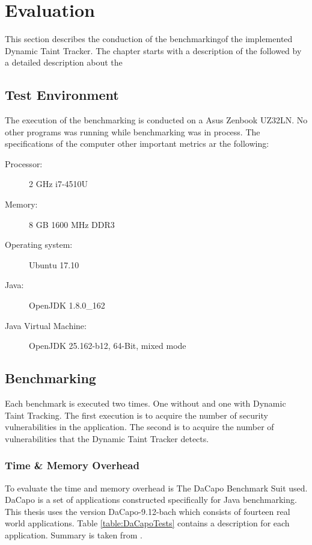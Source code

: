 \chapter{Evaluation}
This section describes the conduction of the benchmarkingof the implemented Dynamic Taint Tracker. The chapter starts with a description of the \textit{} followed by a detailed description about the \textit{}

\section{Test Environment}
\label{TestEnvironment}
The execution of the benchmarking is conducted on a Asus Zenbook UZ32LN. No other programs was running while benchmarking was in process. The specifications of the computer other important metrics ar the following:

\begin{description}
	\item [Processor:] 2 GHz i7-4510U
	\item [Memory:] 8 GB 1600 MHz DDR3
	\item [Operating system:] Ubuntu 17.10
	\item [Java:] OpenJDK 1.8.0\_162
	\item [Java Virtual Machine:] OpenJDK 25.162-b12, 64-Bit, mixed mode
\end{description}



\section{Benchmarking}
\label{Benchmarking}
Each benchmark is executed two times. One without and one with Dynamic Taint Tracking. The first execution is to acquire the number of security vulnerabilities in the application. The second is to acquire the number of vulnerabilities that the Dynamic Taint Tracker detects.



\subsection{Time \& Memory Overhead}
To evaluate the time and memory overhead is The DaCapo Benchmark Suit \parencite{dacapo} used. DaCapo is a set of applications constructed specifically for Java benchmarking. This thesis uses the version DaCapo-9.12-bach which consists of fourteen real world applications. Table \ref{table:DaCapoTests} contains a description for each application. Summary is taken from \textcite{dacapoBench}.

